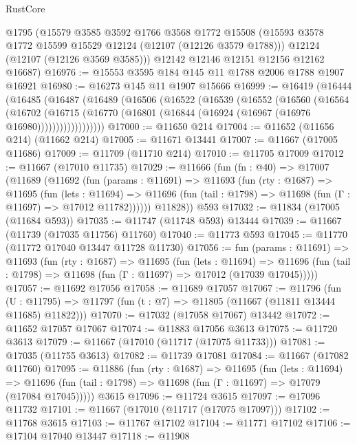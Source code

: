 \begin{lexlean}{RustCore}
\begin{coremodule}
      @1795
      (@15579
        @3585
        @3592
        @1766
        @3568
        @1772
        @15508
        (@15593 @3578 @1772 @15599 @15529 @12124 (@12107 (@12126 @3579 @1788)))
        @12124
        (@12107 (@12126 @3569 @3585)))
      @12142
      @12146
      @12151
      @12156
      @12162
      @16687)
@16976 := @15553 @3595 @184 @145 @11 @1788 @2006 @1788 @1907 @16921
@16980 := @16273 @145 @11 @1907 @15666
@16999 := @16419
    (@16444
      (@16485
        (@16487
          (@16489
            (@16506
              (@16522
                (@16539
                  (@16552
                    (@16560
                      (@16564
                        (@16702
                          (@16715
                            (@16770 (@16801 (@16844 (@16924 (@16967 (@16976 @16980))))))))))))))))))
@17000 := @11650 @214
@17004 := @11652 (@11656 @214) (@11662 @214)
@17005 := @11671 @13441
@17007 := @11667 (@17005 @11686)
@17009 := @11709 (@11710 @214)
@17010 := @11705 @17009
@17012 := @11667 (@17010 @11735)
@17029 := @11666
    (fun (fn : @40) =>
    @17007
      (@11689
        (@11692
          (fun (params : @11691) =>
          @11693
            (fun (rty : @1687) =>
            @11695
              (fun (lets : @11694) =>
              @11696 (fun (tail : @1798) => @11698 (fun (Γ : @11697) => @17012 @11782))))))
        @11828))
    @593
@17032 := @11834 (@17005 (@11684 @593))
@17035 := @11747 (@11748 @593) @13444
@17039 := @11667 (@11739 (@17035 @11756) @11760)
@17040 := @11773 @593
@17045 := @11770 (@11772 @17040 @13447 @11728 @11730)
@17056 := fun (params : @11691) =>
  @11693
    (fun (rty : @1687) =>
    @11695
      (fun (lets : @11694) =>
      @11696 (fun (tail : @1798) => @11698 (fun (Γ : @11697) => @17012 (@17039 @17045)))))
@17057 := @11692 @17056
@17058 := @11689 @17057
@17067 := @11796
    (fun (U : @11795) => @11797 (fun (t : @7) => @11805 (@11667 (@11811 @13444 @11685) @11822)))
@17070 := @17032 (@17058 @17067) @13442
@17072 := @11652 @17057 @17067
@17074 := @11883 @17056 @3613
@17075 := @11720 @3613
@17079 := @11667 (@17010 (@11717 (@17075 @11733)))
@17081 := @17035 (@11755 @3613)
@17082 := @11739 @17081
@17084 := @11667 (@17082 @11760)
@17095 := @11886
    (fun (rty : @1687) =>
    @11695
      (fun (lets : @11694) =>
      @11696 (fun (tail : @1798) => @11698 (fun (Γ : @11697) => @17079 (@17084 @17045)))))
    @3615
@17096 := @11724 @3615
@17097 := @17096 @11732
@17101 := @11667 (@17010 (@11717 (@17075 @17097)))
@17102 := @11768 @3615
@17103 := @11767 @17102
@17104 := @11771 @17102
@17106 := @17104 @17040 @13447
@17118 := @11908

\end{coremodule}
\end{lexlean}
